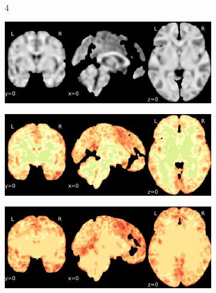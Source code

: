 \documentclass{article}
\begin{document}
\begin{landscape}
\begin{figure}
\begin{subfigure}[t]{0.2\paperheight}
        \end{subfigure} \\
        \begin{subfigure}[b][][c]{0.01\paperwidth} 4 \vspace*{15pt} \end{subfigure}
        \begin{subfigure}[t]{0.2\paperheight}
            \centering
            \includegraphics[width=\textwidth]{figures/ieee_T1/fwhm_5/ieee_ds000256_sub-CTS210.pdf}
        \end{subfigure}
        \begin{subfigure}[t]{0.2\paperheight}
            \centering
            \includegraphics[width=\textwidth]{figures/sig/fwhm_5/rr_ds000256_sub-CTS210_sig.pdf}
        \end{subfigure}
        \begin{subfigure}[t]{0.2\paperheight}
            \centering
            \includegraphics[width=\textwidth]{figures/sig/fwhm_5/rs_ds000256_sub-CTS210_sig.pdf}

\end{subfigure}
\end{figure}
\end{landscape}
\end{document}
